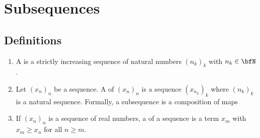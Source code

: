 \chapter*{Subsequences}

\vspace{12pt}
\section*{Definitions}
    \begin{enumerate}[label = (\arabic*)]
        \item A  is a strictly increasing sequence of natural numbers $(n_k)_k$ with $n_k \in \bfN$.
        \item Let $(x_n)_n$ be a sequence. A  of $(x_n)_n$ is a sequence $(x_{n_k})_k$ where $(n_k)_k$ is a natural sequence. Formally, a subsequence is a composition of maps 
        \item If $(x_n)_n$ is a sequence of real numbers, a  of a sequence is a term $x_m$ with $x_m \geq x_n$ for all $n \geq m$.
    \end{enumerate}

